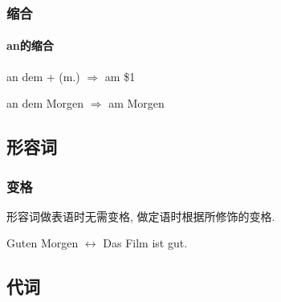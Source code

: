 \documentclass[hidelinks]{ctexart}
\begin{document}


\subsubsection{缩合} %
\label{ssub:缩合}

\paragraph{an的缩合} %
\label{par:an的缩合}

an dem + (m.) $\Longrightarrow$ am \$1

\begin{sample}
    \begin{linguaex}
        \label{langex: an_dem}
        an dem Morgen $\Longrightarrow$ am Morgen
    \end{linguaex}
\end{sample}




\subsection{形容词} %
\label{sub:形容词}

\subsubsection{变格} %
\label{ssub:变格}

形容词做表语时无需变格, 做定语时根据所修饰的变格.

\begin{sample}
    \begin{linguaex}
        \label{langex: gut_und_guten}
        Guten Morgen $\longleftrightarrow$ Das Film ist gut.
    \end{linguaex}
\end{sample}



\subsection{代词} %
\label{sub:代词}
\end{document}
